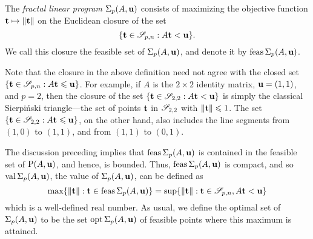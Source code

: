 \documentclass[11pt]{amsart}
\begin{document}
\begin{definition}
\label{fractal program: D}
The \emph{fractal linear program} $\Sigma_p(A,\mathbf{u})$ consists of maximizing the objective function $\mathbf{t}\mapsto \| \mathbf{t} \|$ on the Euclidean closure of the set \[ \{ \mathbf{t} \in \mathscr{S}_{p,n} : A \mathbf{t} < \mathbf{u} \}.\]  We call this closure the feasible set of $\Sigma_p(A, \mathbf{u})$, and denote it by $\operatorname{feas} \Sigma_p(A, \mathbf{u})$.
\end{definition}

\begin{remark}
   Note that the closure in the above definition need not agree with the closed set $\{ \mathbf{t} \in \mathscr{S}_{p,n} : A \mathbf{t} \leqslant \mathbf{u} \}$.
   For example, if $A$ is the $2\times 2$ identity matrix, $\mathbf{u} = (1,1)$, and $p=2$, then the closure of the set $\{ \mathbf{t} \in \mathscr{S}_{2,2} : A \mathbf{t} < \mathbf{u} \}$ is simply the classical Sierpi\'nski triangle---the set of points $\mathbf{t}$ in $\mathscr{S}_{2,2}$ with $\| \mathbf{t} \| \leqslant 1$. The set $\{ \mathbf{t} \in \mathscr{S}_{2,2} : A \mathbf{t} \leqslant \mathbf{u} \}$, on the other hand, also includes the line segments from $(1,0)$ to $(1,1)$, and from $(1,1)$ to $(0,1)$.
\end{remark}

\begin{remark}  The discussion preceding  implies that $\operatorname{feas} \Sigma_p(A, \mathbf{u})$ is contained in the feasible set of $\mathrm{P}(A, \mathbf{u})$, and hence, is bounded.  Thus, $\operatorname{feas} \Sigma_p(A, \mathbf{u})$ is compact, and so $\operatorname{val} \Sigma_p(A, \mathbf{u})$, the value of $\Sigma_p(A, \mathbf{u})$, can be defined as 
   \[ \max \{ \| \mathbf{t} \|: \mathbf{t} \in \operatorname{feas} \Sigma_p(A, \mathbf{u}) \} = \sup \{ \| \mathbf{t} \| : \mathbf{t} \in \mathscr{S}_{p,n}, A \mathbf{t} < \mathbf{u} \} \] which is a well-defined real number.
   As usual, we define the optimal set of $\Sigma_p(A, \mathbf{u})$ to be the set $\operatorname{opt} \Sigma_p(A, \mathbf{u})$ of feasible points where this maximum is attained.
\end{remark}
\end{document}
